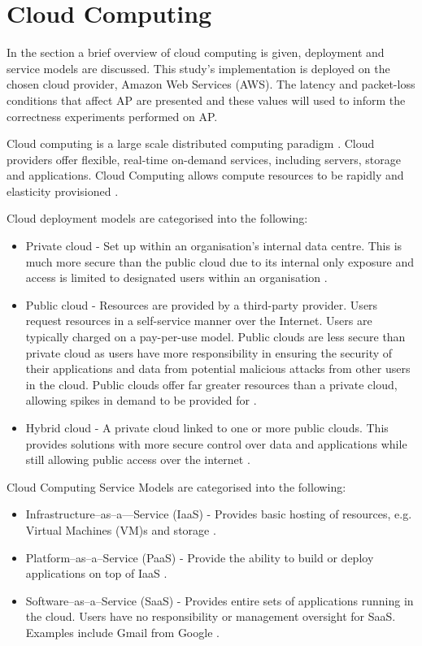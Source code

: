 \section{Cloud Computing}
In the section a brief overview of cloud computing is given, deployment and service models are discussed. This study's implementation is deployed on the chosen cloud provider, Amazon Web Services (AWS). The latency and packet-loss conditions that affect AP are presented and these values will used to inform the correctness experiments performed on AP.


Cloud computing is a large scale distributed computing paradigm \cite{2008CloudComputing}. Cloud providers offer flexible, real-time on-demand services, including servers, storage and applications. Cloud Computing allows compute resources to be rapidly and elasticity provisioned \cite{2012CloudComputing}.

Cloud deployment models are categorised into the following:
\begin{itemize}
\item Private cloud - Set up within an organisation's internal data centre. This is much more secure than the public cloud due to its internal only exposure and access is limited to designated users within an organisation \cite{2012CloudComputing}.
\item Public cloud - Resources are provided by a third-party provider. Users request resources in a self-service manner over the Internet. Users are typically charged on a pay-per-use model. Public clouds are less secure than private cloud as users have more responsibility in ensuring the security of their applications and data from potential malicious attacks from other users in the cloud. Public clouds offer far greater resources than a private cloud, allowing spikes in demand to be provided for  \cite{2012CloudComputing}.
\item Hybrid cloud - A private cloud linked to one or more public clouds. This provides solutions with more secure control over data and applications while still allowing public access over the internet \cite{2012CloudComputing}.
\end{itemize}

Cloud Computing Service Models are categorised into the following:
\begin{itemize}
	\item Infrastructure–as–a—Service (IaaS) - Provides basic hosting of resources, e.g. Virtual Machines (VM)s and storage \cite{2012CloudComputing}.
	\item Platform–as–a–Service (PaaS) - Provide the ability to build or deploy applications on top of IaaS \cite{2012CloudComputing}.
	\item Software–as–a–Service (SaaS) - Provides entire sets of applications running in the cloud. Users have no responsibility or management oversight for SaaS. Examples include Gmail from Google \cite{2012CloudComputing}.	
\end{itemize}

